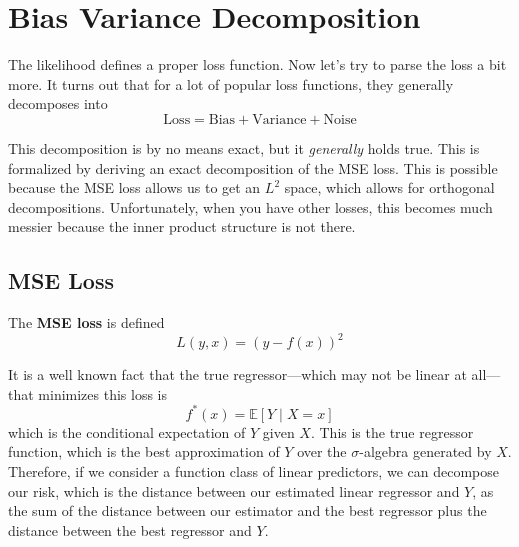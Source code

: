 \section{Bias Variance Decomposition}  

  The likelihood defines a proper loss function. Now let's try to parse the loss a bit more. It turns out that for a lot of popular loss functions, they generally decomposes into 
  \begin{equation}
    \text{Loss} = \text{Bias} + \text{Variance} + \text{Noise}
  \end{equation} 

  This decomposition is by no means exact, but it \textit{generally} holds true. This is formalized by deriving an exact decomposition of the MSE loss. This is possible because the MSE loss allows us to get an $L^2$ space, which allows for orthogonal decompositions. Unfortunately, when you have other losses, this becomes much messier because the inner product structure is not there. 

\subsection{MSE Loss} 

  \begin{definition}
    \label{mse_loss}
    The \textbf{MSE loss} is defined 
    \begin{equation}
      L(y, x) = (y - f(x))^2
    \end{equation}
  \end{definition}

  It is a well known fact that the true regressor---which may not be linear at all---that minimizes this loss is 
  \begin{equation}
    f^\ast (x) = \mathbb{E}[Y \mid X = x]
  \end{equation}
  which is the conditional expectation of $Y$ given $X$. This is the true regressor function, which is the best approximation of $Y$ over the $\sigma$-algebra generated by $X$. Therefore, if we consider a function class of linear predictors, we can decompose our risk, which is the distance between our estimated linear regressor and $Y$, as the sum of the distance between our estimator and the best regressor plus the distance between the best regressor and $Y$. 

